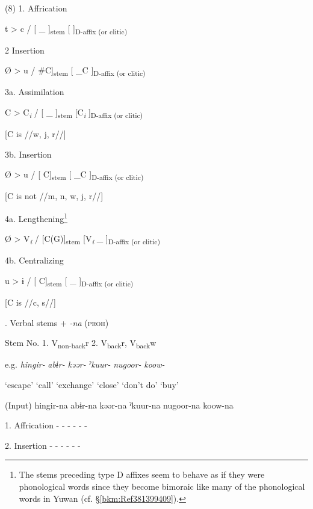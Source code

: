 (8)  1.  Affrication

    t  >  c  /  [    \_ ]\textsubscript{stem}  [  ]\textsubscript{D-affix (or clitic)}

  2  Insertion

    Ø  >  u  /  \#C]\textsubscript{stem}  [ \_C  ]\textsubscript{D-affix (or clitic)}

  3a.  Assimilation

    C  >  C\textit{\textsubscript{i}}  /  [    \_ ]\textsubscript{stem}  [C\textit{\textsubscript{i}}  ]\textsubscript{D-affix (or clitic)}

    [C is //w, j, r//]      

  3b.  Insertion

    Ø  >  u  /  [     C]\textsubscript{stem}  [ \_C  ]\textsubscript{D-affix (or clitic)}

        [C is not //m, n, w, j, r//]  

  4a.  Lengthening\footnote{The stems preceding type D affixes seem to behave as if they were phonological words since they become bimoraic like many of the phonological words in Yuwan (cf. §\ref{bkm:Ref381399409}).}

    Ø  >  V\textit{\textsubscript{i}}  /  [C(G)]\textsubscript{stem}  [V\textit{\textsubscript{i}} \_   ]\textsubscript{D-affix (or clitic)}

  4b.  Centralizing

    u  >  ɨ  /  [    C]\textsubscript{stem}  [ \_  ]\textsubscript{D-affix (or clitic)}

            [C is //c, s//]    

\begin{styleBeschriftung}
\textmd{. Verbal stems +} \textmd{\textit{{}-na}}\textmd{ (\textsc{proh})}
\end{styleBeschriftung}

Stem No.  1. V\textsubscript{non-back}r  2. V\textsubscript{back}r, V\textsubscript{back}w

  e.g.  \textit{hingir-}  \textit{abɨr-}  \textit{kəər-}  \textit{ˀkuur-}  \textit{nugoor-}  \textit{koow-}

    ‘escape’  ‘call’  ‘exchange’  ‘close’  ‘don’t do’  ‘buy’

  (Input)  hingir-na  abɨr-na  kəər-na  ˀkuur-na  nugoor-na  koow-na

1.  Affrication  {}-  {}-  {}-  {}-  {}-  {}-

2.  Insertion  {}-  {}-  {}-  {}-  {}-  {}-

